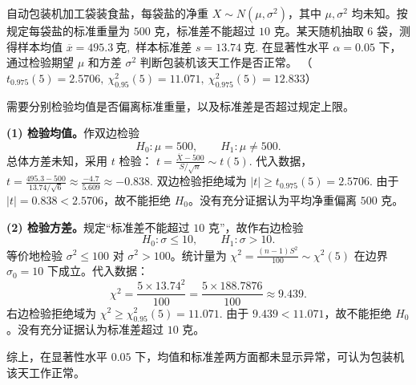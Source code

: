 \documentclass[lang=cn,11pt]{elegantbook}
\begin{document}
\begin{exercise}\label{exer:src-2008-01-3c-iv-06}\label{exer:src-paper4-iv-06}
自动包装机加工袋装食盐，每袋盐的净重 \(X\sim N(\mu,\sigma^2)\)，其中 \(\mu,\sigma^2\) 均未知。按规定每袋盐的标准重量为 \(500\) 克，标准差不能超过 \(10\) 克。某天随机抽取 \(6\) 袋，测得样本均值
\(
\overline{x}=495.3\ \text{克},
\)
样本标准差
\(
s=13.74\ \text{克}.
\)
在显著性水平 \(\alpha=0.05\) 下，通过检验期望 \(\mu\) 和方差 \(\sigma^2\) 判断包装机该天工作是否正常。
（\(t_{0.975}(5)=2.5706,\ \chi^2_{0.95}(5)=11.071,\ \chi^2_{0.975}(5)=12.833\)）
\end{exercise}
\begin{solution}
需要分别检验均值是否偏离标准重量，以及标准差是否超过规定上限。

\textbf{(1) 检验均值。}作双边检验
\[
H_0\colon \mu=500,\qquad H_1\colon \mu\neq500.
\]
总体方差未知，采用 \(t\) 检验：
\(
t=\frac{\overline X-500}{S/\sqrt n}\sim t(5).
\)
代入数据，
\(
t=\frac{495.3-500}{13.74/\sqrt6}
\approx \frac{-4.7}{5.609}
\approx -0.838.
\)
双边检验拒绝域为
\(
|t|\ge t_{0.975}(5)=2.5706.
\)
由于 \(|t|=0.838<2.5706\)，故不能拒绝 \(H_0\)。没有充分证据认为平均净重偏离 \(500\) 克。

\textbf{(2) 检验方差。}规定“标准差不能超过 \(10\) 克”，故作右边检验
\[
H_0\colon \sigma\le10,\qquad H_1\colon \sigma>10.
\]
等价地检验 \(\sigma^2\le100\) 对 \(\sigma^2>100\)。统计量为
\(
\chi^2=\frac{(n-1)S^2}{100}\sim\chi^2(5)
\)
在边界 \(\sigma_0=10\) 下成立。代入数据：
\[
\chi^2=\frac{5\times 13.74^2}{100}
=\frac{5\times188.7876}{100}
\approx9.439.
\]
右边检验拒绝域为
\(
\chi^2\ge\chi^2_{0.95}(5)=11.071.
\)
由于 \(9.439<11.071\)，故不能拒绝 \(H_0\)。没有充分证据认为标准差超过 \(10\) 克。

综上，在显著性水平 \(0.05\) 下，均值和标准差两方面都未显示异常，可认为包装机该天工作正常。
\end{solution}
\end{document}
